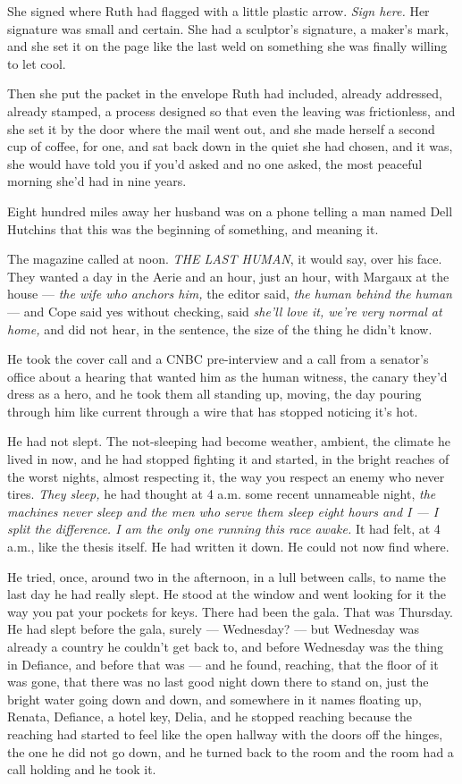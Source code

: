 \documentclass[11pt,openany]{book}
\newcommand{\scenebreak}{\par\vspace{0.5\baselineskip}\begin{center}\textasteriskcentered\quad\textasteriskcentered\quad\textasteriskcentered\end{center}\vspace{0.5\baselineskip}\par}
\begin{document}
She signed where Ruth had flagged with a little plastic arrow. \textit{Sign here.} Her signature was small and certain. She had a sculptor's signature, a maker's mark, and she set it on the page like the last weld on something she was finally willing to let cool.

Then she put the packet in the envelope Ruth had included, already addressed, already stamped, a process designed so that even the leaving was frictionless, and she set it by the door where the mail went out, and she made herself a second cup of coffee, for one, and sat back down in the quiet she had chosen, and it was, she would have told you if you'd asked and no one asked, the most peaceful morning she'd had in nine years.

Eight hundred miles away her husband was on a phone telling a man named Dell Hutchins that this was the beginning of something, and meaning it.


\scenebreak


The magazine called at noon. \textit{THE LAST HUMAN}, it would say, over his face. They wanted a day in the Aerie and an hour, just an hour, with Margaux at the house --- \textit{the wife who anchors him,} the editor said, \textit{the human behind the human} --- and Cope said yes without checking, said \textit{she'll love it, we're very normal at home,} and did not hear, in the sentence, the size of the thing he didn't know.

He took the cover call and a CNBC pre-interview and a call from a senator's office about a hearing that wanted him as the human witness, the canary they'd dress as a hero, and he took them all standing up, moving, the day pouring through him like current through a wire that has stopped noticing it's hot.

He had not slept. The not-sleeping had become weather, ambient, the climate he lived in now, and he had stopped fighting it and started, in the bright reaches of the worst nights, almost respecting it, the way you respect an enemy who never tires. \textit{They sleep,} he had thought at 4 a.m. some recent unnameable night, \textit{the machines never sleep and the men who serve them sleep eight hours and I --- I split the difference. I am the only one running this race awake.} It had felt, at 4 a.m., like the thesis itself. He had written it down. He could not now find where.

He tried, once, around two in the afternoon, in a lull between calls, to name the last day he had really slept. He stood at the window and went looking for it the way you pat your pockets for keys. There had been the gala. That was Thursday. He had slept before the gala, surely --- Wednesday? --- but Wednesday was already a country he couldn't get back to, and before Wednesday was the thing in Defiance, and before that was --- and he found, reaching, that the floor of it was gone, that there was no last good night down there to stand on, just the bright water going down and down, and somewhere in it names floating up, Renata, Defiance, a hotel key, Delia, and he stopped reaching because the reaching had started to feel like the open hallway with the doors off the hinges, the one he did not go down, and he turned back to the room and the room had a call holding and he took it.
\end{document}
